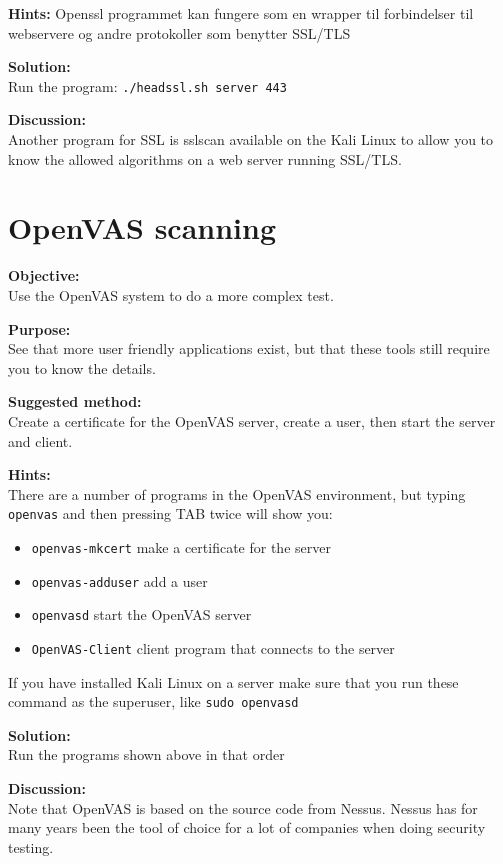 \documentclass[a4paper,11pt,notitlepage]{report}
\begin{document}
{\bf Hints:}
Openssl programmet kan fungere som en wrapper til forbindelser til
webservere og andre protokoller som benytter SSL/TLS

{\bf Solution:}\\
Run the program: \verb+./headssl.sh server 443+


{\bf Discussion:} \\
Another program for SSL is sslscan available on the Kali Linux to allow you to know the allowed algorithms on a web server running SSL/TLS.


\chapter{OpenVAS scanning}
\label{ex:openvas}

{\bf Objective:}\\
Use the OpenVAS system to do a more complex test.

{\bf Purpose:}\\
See that more user friendly applications exist, but that these tools still require you to know the details.

{\bf Suggested method:} \\
Create a certificate for the OpenVAS server, create a user, then start the server and client.

{\bf Hints:}\\
There are a number of programs in the OpenVAS environment, but typing \verb+openvas+ and then pressing TAB twice will show you:
\begin{itemize}
\item \verb+openvas-mkcert+ make a certificate for the server
\item \verb+openvas-adduser+ add a user
\item \verb+openvasd+ start the OpenVAS server
\item \verb+OpenVAS-Client+ client program that connects to the server
\end{itemize}

If you have installed Kali Linux on a server make sure that you run these command as the superuser, like \verb+sudo openvasd+

{\bf Solution:}\\
Run the programs shown above in that order

{\bf Discussion:} \\
Note that OpenVAS is based on the source code from Nessus. Nessus has for many years been the tool of choice for a lot of companies when doing security testing.
\end{document}
